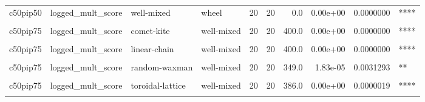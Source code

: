 \documentclass[
]{book}
\begin{document}
\begin{table}
\begin{tabular}{l|l|l|l|r|r|r|r|r|l}
\hline
\cellcolor{gray!6}{c50pip50} & \cellcolor{gray!6}{logged\_mult\_score} & \cellcolor{gray!6}{toroidal-lattice} & \cellcolor{gray!6}{well-mixed} & \cellcolor{gray!6}{20} & \cellcolor{gray!6}{20} & \cellcolor{gray!6}{394.0} & \cellcolor{gray!6}{0.00e+00} & \cellcolor{gray!6}{0.0000001} & \cellcolor{gray!6}{****}\\
\hline
c50pip50 & logged\_mult\_score & well-mixed & wheel & 20 & 20 & 0.0 & 0.00e+00 & 0.0000000 & ****\\
\hline
\cellcolor{gray!6}{c50pip50} & \cellcolor{gray!6}{logged\_mult\_score} & \cellcolor{gray!6}{well-mixed} & \cellcolor{gray!6}{windmill} & \cellcolor{gray!6}{20} & \cellcolor{gray!6}{20} & \cellcolor{gray!6}{23.0} & \cellcolor{gray!6}{1.00e-07} & \cellcolor{gray!6}{0.0000188} & \cellcolor{gray!6}{****}\\
\hline
c50pip75 & logged\_mult\_score & comet-kite & well-mixed & 20 & 20 & 400.0 & 0.00e+00 & 0.0000000 & ****\\
\hline
\cellcolor{gray!6}{c50pip75} & \cellcolor{gray!6}{logged\_mult\_score} & \cellcolor{gray!6}{cycle} & \cellcolor{gray!6}{well-mixed} & \cellcolor{gray!6}{20} & \cellcolor{gray!6}{20} & \cellcolor{gray!6}{400.0} & \cellcolor{gray!6}{0.00e+00} & \cellcolor{gray!6}{0.0000000} & \cellcolor{gray!6}{****}\\
\hline
c50pip75 & logged\_mult\_score & linear-chain & well-mixed & 20 & 20 & 400.0 & 0.00e+00 & 0.0000000 & ****\\
\hline
\cellcolor{gray!6}{c50pip75} & \cellcolor{gray!6}{logged\_mult\_score} & \cellcolor{gray!6}{random-barabasi-albert} & \cellcolor{gray!6}{well-mixed} & \cellcolor{gray!6}{20} & \cellcolor{gray!6}{20} & \cellcolor{gray!6}{388.0} & \cellcolor{gray!6}{0.00e+00} & \cellcolor{gray!6}{0.0000010} & \cellcolor{gray!6}{****}\\
\hline
c50pip75 & logged\_mult\_score & random-waxman & well-mixed & 20 & 20 & 349.0 & 1.83e-05 & 0.0031293 & **\\
\hline
\cellcolor{gray!6}{c50pip75} & \cellcolor{gray!6}{logged\_mult\_score} & \cellcolor{gray!6}{star} & \cellcolor{gray!6}{well-mixed} & \cellcolor{gray!6}{20} & \cellcolor{gray!6}{20} & \cellcolor{gray!6}{400.0} & \cellcolor{gray!6}{0.00e+00} & \cellcolor{gray!6}{0.0000000} & \cellcolor{gray!6}{****}\\
\hline
c50pip75 & logged\_mult\_score & toroidal-lattice & well-mixed & 20 & 20 & 386.0 & 0.00e+00 & 0.0000019 & ****\\
\hline
\cellcolor{gray!6}{c50pip75} & \cellcolor{gray!6}{logged\_mult\_score} & \cellcolor{gray!6}{well-mixed} & \cellcolor{gray!6}{wheel} & \cellcolor{gray!6}{20} & \cellcolor{gray!6}{20} & \cellcolor{gray!6}{0.0} & \cellcolor{gray!6}{0.00e+00} & \cellcolor{gray!6}{0.0000000} & \cellcolor{gray!6}{****}\\

\end{tabular}
\end{table}
\end{document}
